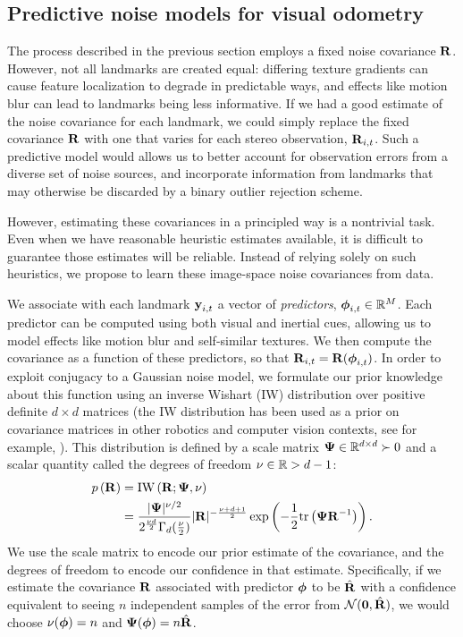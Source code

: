\subsection{Predictive noise models for visual odometry}

The process described in the previous section employs a fixed noise covariance
$\boldsymbol{\mathbf{R}}$.  However, not all landmarks are created equal: differing texture
gradients can cause feature localization to degrade in predictable ways, and
effects like motion blur can lead to landmarks being less informative. If we had a
good estimate of the noise covariance for each landmark, we could simply replace the fixed covariance $\boldsymbol{\mathbf{R}}$
with one that varies for each stereo observation,
$\boldsymbol{\mathbf{R}}_{i,t}$. Such a predictive model would allows us to  better account for observation errors from a diverse set of noise sources, and incorporate information from landmarks that may otherwise be discarded by a binary outlier rejection scheme.

However, estimating these covariances in a principled way is a nontrivial task.
Even when we have reasonable heuristic estimates available, it is difficult
to guarantee those estimates will be reliable.  Instead of relying solely on such
heuristics, we propose to learn these image-space noise covariances from data.

We associate with each landmark $\boldsymbol{\mathbf{y}}_{i,t}$ a vector of
\emph{predictors}, $\Predictor{i}{t}\in\RealNumbers[M]$.  Each predictor can be computed using both visual and inertial cues, allowing us to model effects like motion blur and self-similar
textures. We then compute the covariance as a function of these predictors, so
that $\boldsymbol{\mathbf{R}}_{i,t} = \boldsymbol{\mathbf{R}}( \boldsymbol{\mathbf{\phi}}_{i,t})$.  In
order to exploit conjugacy to a Gaussian noise model, we formulate our prior knowledge
about this function using an inverse Wishart (IW) distribution over positive
definite $d \times d$ matrices (the IW distribution has been used as a prior on covariance matrices in other robotics and computer vision contexts, see for example, \citep{fitzgibbon2007learning}). This distribution is defined by a scale matrix
$\Matrix{\Psi} \in \RealNumbers[d][d]\succ0$ and a scalar quantity called the
degrees of freedom $\nu\in\RealNumbers>d-1$:
\begin{align}
  p\left(\boldsymbol{\mathbf{R}}\right) &= \text{IW}
  \left(\boldsymbol{\mathbf{R}}; \boldsymbol{\mathbf{\Psi}}, \nu\right)  \\ 
  &= \frac{\vert\boldsymbol{\mathbf{\Psi}}\vert^{\nu/2}}{2^{\frac{\nu
  d}{2}}\Gamma_d(\frac{\nu}{2})} \vert\boldsymbol{\mathbf{R}}\vert
  ^{-\frac{\nu+d+1}{2}} \exp\left( -\frac{1}{2} \text{tr}\left(\boldsymbol{\mathbf{\Psi}}
  \boldsymbol{\mathbf{R}}^{-1}\right)\right) \nonumber.
\end{align}
We use the scale matrix to encode our prior estimate of the
covariance, and the degrees of freedom to encode our confidence in
that estimate.  Specifically, if we estimate the covariance $\boldsymbol{\mathbf{R}}$
associated with predictor $\boldsymbol{\mathbf{\phi}}$ to be $\hat{\boldsymbol{\mathbf{R}}}$ with a
confidence equivalent to seeing $n$ independent samples of the error from
$\mathcal{N}(\boldsymbol{\mathbf{0}}, \hat{\boldsymbol{\mathbf{R}}})$, we would choose
$\nu(\boldsymbol{\mathbf{\phi}})=n$ and $\boldsymbol{\mathbf{\Psi}}(\boldsymbol{\mathbf{\phi}})=n\hat{\boldsymbol{\mathbf{R}}}$.

